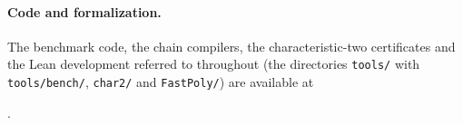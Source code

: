 









\paragraph{Code and formalization.}
The benchmark code, the chain compilers, the characteristic-two certificates and
the Lean development referred to throughout (the directories \texttt{tools/} with
\texttt{tools/bench/}, \texttt{char2/} and \texttt{FastPoly/}) are available at\par\noindent\coderepo.


\appendix















